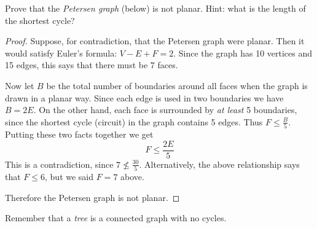 \documentclass[10pt]{exam}
\def\vertexsize{4pt}
\newcommand{\vtx}[2]{node[fill,circle,inner sep=0pt, minimum size=\vertexsize,label=#1:#2]{}}
\renewcommand{\v}{\vtx{above}{}}
\begin{document}
\begin{questions}
\question[6] Prove that the {\em Petersen graph} (below) is not planar.  Hint: what is the length of the shortest cycle?

\begin{center}
\end{center}

\begin{solution}
  \begin{proof}
    Suppose, for contradiction, that the Petersen graph were planar.  Then it would satisfy Euler's formula: $V - E + F = 2$.  Since the graph has 10 vertices and 15 edges, this says that there must be $7$ faces.  
    
    Now let $B$ be the total number of boundaries around all faces when the graph is drawn in a planar way.  Since each edge is used in two boundaries we have $B = 2E$.  On the other hand, each face is surrounded by {\em at least} 5 boundaries, since the shortest cycle (circuit) in the graph contains 5 edges.  Thus $F \le \frac{B}{5}$.  Putting these two facts together we get
    \[F \le \frac{2E}{5}\]
    This is a contradiction, since $7 \not\le \frac{30}{5}$.  Alternatively, the above relationship says that $F \le 6$, but we said $F = 7$ above.
    
    Therefore the Petersen graph is not planar.
  \end{proof}

\end{solution}


\question[9] Remember that a {\em tree} is a connected graph with no cycles.
\end{questions}
\end{document}
